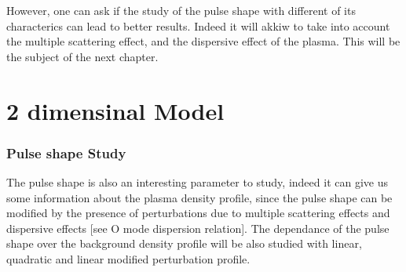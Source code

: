 \documentclass[11pt,a4paper,openany]{report}
\begin{document}
\begin{multicols}{2}
    However, one can ask if the study of the pulse shape with different of its characterics can lead to better results. Indeed it will akkiw to take into account the multiple scattering effect, and the dispersive effect of the plasma. This will be the subject of the next chapter.
    \chapter{2 dimensinal Model}

    \subsection{Pulse shape Study}
    The pulse shape is also an interesting parameter to study, indeed it can give us some information about the plasma density profile, since the pulse shape can be modified by the presence of perturbations due to multiple scattering effects and dispersive effects [see O mode dispersion relation].
    The dependance of the pulse shape over the background density profile will be also studied with linear, quadratic and linear modified perturbation profile.



\end{multicols}
\end{document}

